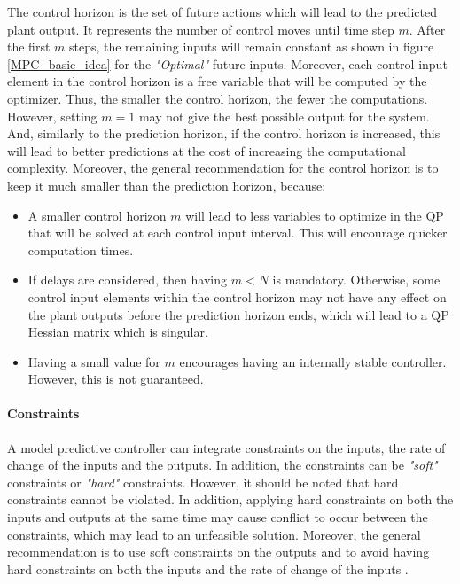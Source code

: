 \documentclass{thesisreport}
\begin{document}
The control horizon is the set of future actions which will lead to the predicted plant output. It represents the number of control moves until time step $m$. After the first $m$ steps, the remaining inputs will remain constant as shown in figure \ref{MPC_basic_idea} for the \textit{"Optimal"} future inputs. Moreover, each control input element in the control horizon is a free variable that will be computed by the optimizer. Thus, the smaller the control horizon, the fewer the computations. However, setting $m=1$ may not give the best possible output for the system. And, similarly to the prediction horizon, if the control horizon is increased, this will lead to better predictions at the cost of increasing the computational complexity. Moreover, the general recommendation for the control horizon is to keep it much smaller than the prediction horizon, because:

\begin{itemize}
	\item A smaller control horizon $m$ will lead to less variables to optimize in the QP that will be solved at each control input interval. This will encourage quicker computation times.
	\item If delays are considered, then having $m<N$ is mandatory. Otherwise, some control input elements within the control horizon  may not have any effect on the plant outputs before the prediction horizon ends, which will lead to a QP Hessian matrix which is singular. 
	\item Having a small value for $m$ encourages having an internally stable controller. However, this is not guaranteed.
\end{itemize}

\paragraph{Constraints} A model predictive controller can integrate constraints on the inputs, the rate of change of the inputs and the outputs. In addition, the constraints can be \textit{"soft"} constraints or \textit{"hard"} constraints. However, it should be noted that hard constraints cannot be violated. In addition, applying hard constraints on both the inputs and outputs at the same time may cause conflict to occur between the constraints, which may lead to an unfeasible solution. Moreover, the general recommendation is to use soft constraints on the outputs and to avoid having hard constraints on both the inputs and the rate of change of the inputs .
\end{document}
